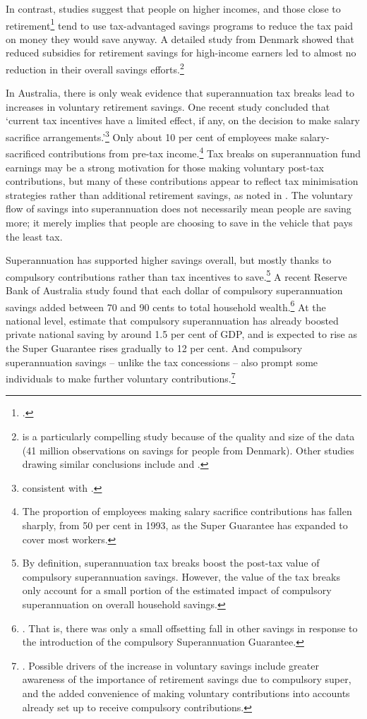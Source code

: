 In contrast, studies suggest that people on higher incomes, and those close to retirement\footcite{AyusoJimenoVillanueva2007} tend to use tax-advantaged savings programs to reduce the tax paid on money they would save anyway. A detailed study from Denmark showed that reduced subsidies for retirement savings for high-income earners led to almost no reduction in their overall savings efforts.\footnote{\textcite{ChettyFriedmanLethPetersenEtAl2014} is a particularly compelling study because of the quality and size of the data (41 million observations on savings for people from Denmark). Other studies drawing similar conclusions include \textcite{EngenGale2000} and \textcite{Benjamin2003}.}

In Australia, there is only weak evidence that superannuation tax breaks lead to increases in voluntary retirement savings. One recent study concluded that ‘current tax incentives have a limited effect, if any, on the decision to make salary sacrifice arrangements.’\footnote{\textcite{Feng2014} consistent with .}
Only about 10 per cent of employees make salary-sacrificed contributions from pre-tax income.\footnote{\textcite{ABS2013t} The proportion of employees making salary sacrifice contributions has fallen sharply, from 50 per cent in 1993, as the Super Guarantee has expanded to cover most workers.}
Tax breaks on superannuation fund earnings may be a strong motivation for those making voluntary post-tax contributions, but many of these contributions appear to reflect tax minimisation strategies rather than additional retirement savings, as noted in . The voluntary flow of savings into superannuation does not necessarily mean people are saving more; it merely implies that people are choosing to save in the vehicle that pays the least tax. 

Superannuation has supported higher savings overall, but mostly thanks to compulsory contributions rather than tax incentives to save.\footnote{By definition, superannuation tax breaks boost the post-tax value of compulsory superannuation savings. However, the value of the tax breaks only account for a small portion of the estimated impact of compulsory superannuation on overall household savings.} 
A recent Reserve Bank of Australia study found that each dollar of compulsory superannuation savings added between 70 and 90 cents to total household wealth.\footnote{\textcite{Connolly2007}. That is, there was only a small offsetting fall in other savings in response to the introduction of the compulsory Superannuation Guarantee.} 
At the national level, \textcite{GruenSoding2011} estimate that compulsory superannuation has already boosted private national saving by around 1.5 per cent of GDP, and is expected to rise as the Super Guarantee rises gradually to 12 per cent. And compulsory superannuation savings – unlike the tax concessions – also prompt some individuals to make further voluntary contributions.\footnote{\textcite[][4]{Connolly2007}. Possible drivers of the increase in voluntary savings include greater awareness of the importance of retirement savings due to compulsory super, and the added convenience of making voluntary contributions into accounts already set up to receive compulsory contributions.}

